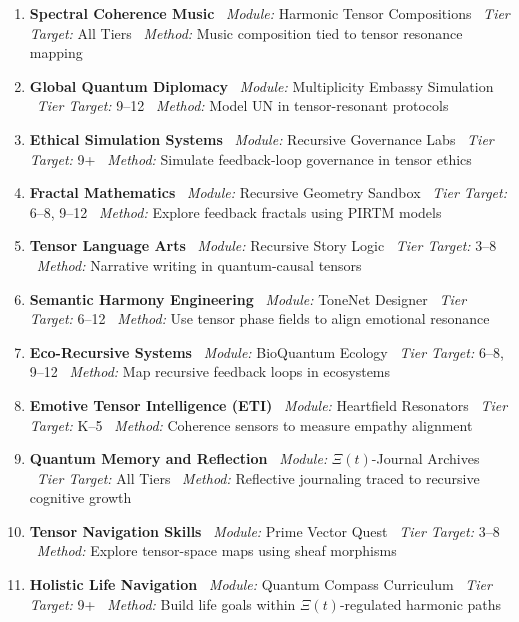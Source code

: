 \documentclass{article}
\theoremstyle{plain}
\theoremstyle{claimstyle}
\begin{document}
\begin{enumerate}[leftmargin=*]
\item \textbf{Spectral Coherence Music} \ \textit{Module:} Harmonic Tensor Compositions \ \textit{Tier Target:} All Tiers \ \textit{Method:} Music composition tied to tensor resonance mapping

\item \textbf{Global Quantum Diplomacy} \ \textit{Module:} Multiplicity Embassy Simulation \ \textit{Tier Target:} 9--12 \ \textit{Method:} Model UN in tensor-resonant protocols

\item \textbf{Ethical Simulation Systems} \ \textit{Module:} Recursive Governance Labs \ \textit{Tier Target:} 9+ \ \textit{Method:} Simulate feedback-loop governance in tensor ethics

\item \textbf{Fractal Mathematics} \ \textit{Module:} Recursive Geometry Sandbox \ \textit{Tier Target:} 6--8, 9--12 \ \textit{Method:} Explore feedback fractals using PIRTM models

\item \textbf{Tensor Language Arts} \ \textit{Module:} Recursive Story Logic \ \textit{Tier Target:} 3--8 \ \textit{Method:} Narrative writing in quantum-causal tensors

\item \textbf{Semantic Harmony Engineering} \ \textit{Module:} ToneNet Designer \ \textit{Tier Target:} 6--12 \ \textit{Method:} Use tensor phase fields to align emotional resonance

\item \textbf{Eco-Recursive Systems} \ \textit{Module:} BioQuantum Ecology \ \textit{Tier Target:} 6--8, 9--12 \ \textit{Method:} Map recursive feedback loops in ecosystems

\item \textbf{Emotive Tensor Intelligence (ETI)} \ \textit{Module:} Heartfield Resonators \ \textit{Tier Target:} K--5 \ \textit{Method:} Coherence sensors to measure empathy alignment

\item \textbf{Quantum Memory and Reflection} \ \textit{Module:} $\Xi(t)$-Journal Archives \ \textit{Tier Target:} All Tiers \ \textit{Method:} Reflective journaling traced to recursive cognitive growth

\item \textbf{Tensor Navigation Skills} \ \textit{Module:} Prime Vector Quest \ \textit{Tier Target:} 3--8 \ \textit{Method:} Explore tensor-space maps using sheaf morphisms

\item \textbf{Holistic Life Navigation} \ \textit{Module:} Quantum Compass Curriculum \ \textit{Tier Target:} 9+ \ \textit{Method:} Build life goals within $\Xi(t)$-regulated harmonic paths
\end{enumerate}
\end{document}
